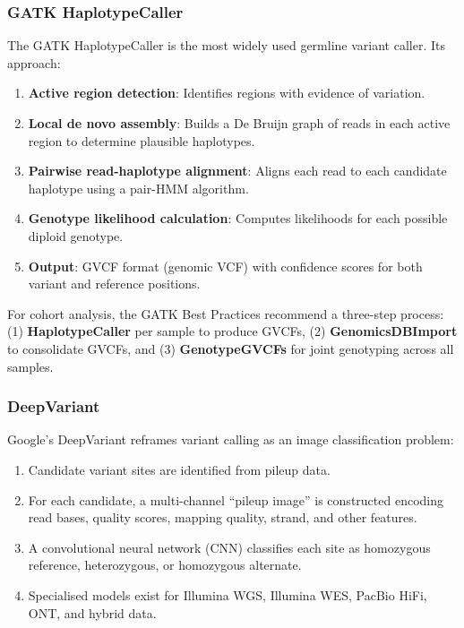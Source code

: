 \subsubsection{GATK HaplotypeCaller}

The GATK HaplotypeCaller is the most widely used germline variant caller. Its approach:
\begin{enumerate}[nosep]
  \item \textbf{Active region detection}: Identifies regions with evidence of variation.
  \item \textbf{Local de novo assembly}: Builds a De Bruijn graph of reads in each active region to determine plausible haplotypes.
  \item \textbf{Pairwise read-haplotype alignment}: Aligns each read to each candidate haplotype using a pair-HMM algorithm.
  \item \textbf{Genotype likelihood calculation}: Computes likelihoods for each possible diploid genotype.
  \item \textbf{Output}: GVCF format (genomic VCF) with confidence scores for both variant and reference positions.
\end{enumerate}

For cohort analysis, the GATK Best Practices recommend a three-step process: (1) \textbf{HaplotypeCaller} per sample to produce GVCFs, (2) \textbf{GenomicsDBImport} to consolidate GVCFs, and (3) \textbf{GenotypeGVCFs} for joint genotyping across all samples.

\subsubsection{DeepVariant}

Google's DeepVariant reframes variant calling as an image classification problem:
\begin{enumerate}[nosep]
  \item Candidate variant sites are identified from pileup data.
  \item For each candidate, a multi-channel ``pileup image'' is constructed encoding read bases, quality scores, mapping quality, strand, and other features.
  \item A convolutional neural network (CNN) classifies each site as homozygous reference, heterozygous, or homozygous alternate.
  \item Specialised models exist for Illumina WGS, Illumina WES, PacBio HiFi, ONT, and hybrid data.
\end{enumerate}

